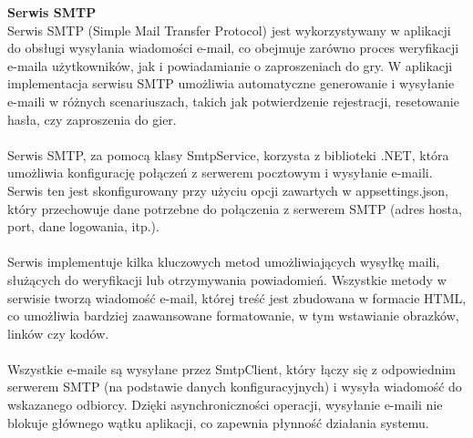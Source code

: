 \documentclass[12pt,a4paper]{article}
\begin{document}
\newpage

\noindent \textbf{Serwis SMTP}\\
Serwis SMTP (Simple Mail Transfer Protocol) jest wykorzystywany w aplikacji do obsługi wysyłania wiadomości e-mail, co obejmuje zarówno proces weryfikacji e-maila użytkowników, jak i powiadamianie o zaproszeniach do gry. W aplikacji implementacja serwisu SMTP umożliwia automatyczne generowanie i wysyłanie e-maili w różnych scenariuszach, takich jak potwierdzenie rejestracji, resetowanie hasła, czy zaproszenia do gier.
\\\\
Serwis SMTP, za pomocą klasy SmtpService, korzysta z biblioteki .NET, która umożliwia konfigurację połączeń z serwerem pocztowym i wysyłanie e-maili. Serwis ten jest skonfigurowany przy użyciu opcji zawartych w appsettings.json, który przechowuje dane potrzebne do połączenia z serwerem SMTP (adres hosta, port, dane logowania, itp.).
\\\\
Serwis implementuje kilka kluczowych metod umożliwiających wysyłkę maili, służących do weryfikacji lub otrzymywania powiadomień. Wszystkie metody w serwisie tworzą wiadomość e-mail, której treść jest zbudowana w formacie HTML, co umożliwia bardziej zaawansowane formatowanie, w tym wstawianie obrazków, linków czy kodów.
\\\\
Wszystkie e-maile są wysyłane przez SmtpClient, który łączy się z odpowiednim serwerem SMTP (na podstawie danych konfiguracyjnych) i wysyła wiadomość do wskazanego odbiorcy. Dzięki asynchroniczności operacji, wysyłanie e-maili nie blokuje głównego wątku aplikacji, co zapewnia płynność działania systemu.
\\\\
\end{document}
